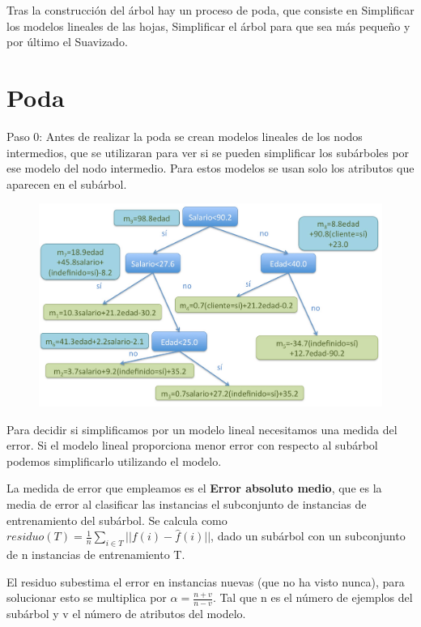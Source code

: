 \documentclass[12pt]{report} %
\begin{document}
Tras la construcción del árbol hay un proceso de poda, que consiste en
Simplificar los modelos lineales de las hojas, Simplificar el árbol para
que sea más pequeño y por último el Suavizado.
\newpage
\section{Poda}

Paso 0: Antes de realizar la poda se crean modelos lineales de los nodos
intermedios, que se utilizaran para ver si se pueden simplificar los
subárboles por ese modelo del nodo intermedio. Para estos modelos se
usan solo los atributos que aparecen en el subárbol.

\begin{figure}[H]
	{\includegraphics[scale=.15]{image-20210312090434196.png}}
\end{figure}

Para decidir si simplificamos por un modelo lineal necesitamos una
medida del error. Si el modelo lineal proporciona menor error con
respecto al subárbol podemos simplificarlo utilizando el modelo.

La medida de error que empleamos es el \textbf{Error absoluto medio},
que es la media de error al clasificar las instancias el subconjunto de
instancias de entrenamiento del subárbol. Se calcula como $residuo(T) = \frac 1 n \sum _{i \in T} ||f(i)- \hat{f}(i)||$, dado un
subárbol con un subconjunto de n instancias de entrenamiento T.

El residuo subestima el error en instancias nuevas (que no ha visto
nunca), para solucionar esto se multiplica por
\(\alpha = \frac {n+v}{n-v}\). Tal que n es el número de ejemplos del
subárbol y v el número de atributos del modelo.
\end{document}
